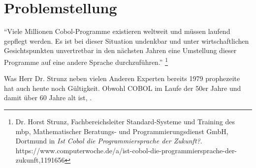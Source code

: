 \section{Problemstellung}

``Viele Millionen Cobol-Programme existieren weltweit und müssen laufend gepflegt werden.
Es ist bei dieser Situation undenkbar und unter wirtschaftlichen Gesichtspunkten unvertretbar in den nächsten Jahren eine Umstellung dieser Programme auf eine andere Sprache durchzuführen.'' \footnote{Dr. Horst Strunz, Fachbereichsleiter Standard-Systeme und Training des mbp, Mathematischer Beratungs- und Programmierungsdienst GmbH, Dortmund in \textit{Ist Cobol die Programmiersprache der Zukunft?}. \\ https://www.computerwoche.de/a/ist-cobol-die-programmiersprache-der-zukunft,1191656}

Was Herr Dr. Strunz neben vielen Anderen Experten bereits 1979 prophezeite hat auch heute noch Gültigkeit. Obwohl COBOL im Laufe der 50er Jahre und damit über 60 Jahre alt ist, .

